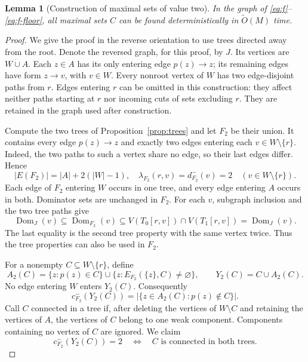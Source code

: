 \documentclass[11pt]{article}
\newtheorem{lemma}[theorem]{Lemma}
\theoremstyle{definition}
\theoremstyle{remark}
\newcommand{\OO}{\widetilde O}
\newcommand{\Dom}{\operatorname{Dom}}
\begin{document}
\begin{lemma}[Construction of maximal sets of value two]
\label{lem:find-two}
In the graph of \eqref{eq:f}--\eqref{eq:f-floor}, all maximal sets \(C\) can be found deterministically in \(\OO(M)\) time.
\end{lemma}
\begin{proof}
We give the proof in the reverse orientation to use trees directed away from the root. Denote the reversed graph, for this proof, by \(J\). Its vertices are \(W\dot\cup A\). Each \(z\in A\) has its only entering edge \(p(z)\to z\); its remaining edges have form \(z\to v\), with \(v\in W\). Every nonroot vertex of \(W\) has two edge-disjoint paths from \(r\). Edges entering \(r\) can be omitted in this construction: they affect neither paths starting at \(r\) nor incoming cuts of sets excluding \(r\). They are retained in the graph used after construction.

Compute the two trees of Proposition~\ref{prop:trees} and let \(F_2\) be their union. It contains every edge \(p(z)\to z\) and exactly two edges entering each \(v\in W\setminus\{r\}\). Indeed, the two paths to such a vertex share no edge, so their last edges differ. Hence
\begin{equation}
 |E(F_2)|=|A|+2(|W|-1),\quad
 \lambda_{F_2}(r,v)=d^-_{F_2}(v)=2\quad(v\in W\setminus\{r\}).
 \label{eq:seed}
\end{equation}
Each edge of \(F_2\) entering \(W\) occurs in one tree, and every edge entering \(A\) occurs in both. Dominator sets are unchanged in \(F_2\). For each \(v\), subgraph inclusion and the two tree paths give
\[
 \Dom_J(v)\subseteq\Dom_{F_2}(v)
 \subseteq V(T_0[r,v])\cap V(T_1[r,v])=\Dom_J(v).
\]
The last equality is the second tree property with the same vertex twice. Thus the tree properties can also be used in \(F_2\).

For a nonempty \(C\subseteq W\setminus\{r\}\), define
\[
 A_2(C)=\{z:p(z)\in C\}
       \cup\{z:E_{F_2}(\{z\},C)\ne\varnothing\},\qquad
 Y_2(C)=C\cup A_2(C).
\]
No edge entering \(W\) enters \(Y_2(C)\). Consequently
\begin{equation}
 c^-_{F_2}(Y_2(C))=|\{z\in A_2(C):p(z)\notin C\}|.
 \label{eq:seed-cut}
\end{equation}
Call \(C\) connected in a tree if, after deleting the vertices of \(W\setminus C\) and retaining the vertices of \(A\), the vertices of \(C\) belong to one weak component. Components containing no vertex of \(C\) are ignored. We claim
\begin{equation}
 c^-_{F_2}(Y_2(C))=2
 \quad\Longleftrightarrow\quad
 C\text{ is connected in both trees}.
 \label{eq:two-tree-criterion}
\end{equation}


\end{proof}
\end{document}
